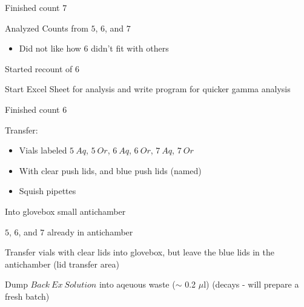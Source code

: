 \documentclass[idxtotoc,hyperref,openany,oneside]{labbook} %
\newcommand{\cmark}{\ding{51}}%
\newcommand{\done}{\rlap{$\square$}{\raisebox{2pt}{\large\hspace{1pt}\cmark}}%
  \hspace{-2.5pt}}
\begin{document}

\begin{todolist}
\item[\done]{Finished count $\boxed{7}$}
\item[\done]{Analyzed Counts from $\boxed{5}$, $\boxed{6}$, and
  $\boxed{7}$}
  \begin{itemize}
  \item{Did not like how $\boxed{6}$ didn't fit with others}
  \end{itemize}
\item[\done]{Started recount of $\boxed{6}$}
\item[\done]{Start Excel Sheet for analysis and
           write program for quicker gamma analysis}
\end{todolist}




\begin{todolist}
\item[\done]{Finished count $\boxed{6}$}
\item[\done]{Transfer:}
  \begin{itemize}
  \item{Vials labeled $\boxed{5\ Aq}$, 
    $\boxed{5\ Or}$, $\boxed{6\ Aq}$, $\boxed{6\ Or}$,
    $\boxed{7\ Aq}$, $\boxed{7\ Or}$}
  \item{With clear push lids, and blue push lids (named)}
  \item{Squish pipettes}
  \end{itemize}
  Into glovebox small antichamber
\item[\done]{$\boxed{5}$, $\boxed{6}$, and $\boxed{7}$ already
  in antichamber}
\item[\done]{Transfer vials with clear lids into glovebox, but
  leave the blue lids in the antichamber (lid transfer area)}
\item[\done]{Dump $\boxed{Back\ Ex\ Solution}$ into aqeuous
  waste ($\sim$ 0.2 $\mu$l) (decays - will prepare a fresh batch)}
\end{todolist}

\end{document}
